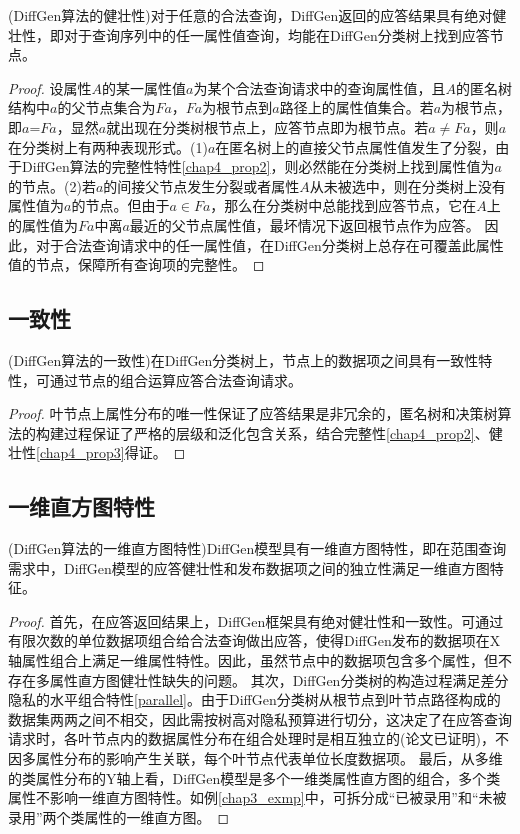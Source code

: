 \begin{prop}
	(DiffGen算法的健壮性)对于任意的合法查询，DiffGen返回的应答结果具有绝对健壮性，即对于查询序列中的任一属性值查询，均能在DiffGen分类树上找到应答节点。
\end{prop}
\begin{proof}
	设属性$A$的某一属性值$a$为某个合法查询请求中的查询属性值，且$A$的匿名树结构中$a$的父节点集合为$Fa$，$Fa$为根节点到$a$路径上的属性值集合。若$a$为根节点，即$a$=$Fa$，显然$a$就出现在分类树根节点上，应答节点即为根节点。若$a$$\neq$$Fa$，则$a$在分类树上有两种表现形式。(1)$a$在匿名树上的直接父节点属性值发生了分裂，由于DiffGen算法的完整性特性\ref{chap4_prop2}，则必然能在分类树上找到属性值为$a$的节点。(2)若$a$的间接父节点发生分裂或者属性$A$从未被选中，则在分类树上没有属性值为$a$的节点。但由于$a$$\in$$Fa$，那么在分类树中总能找到应答节点，它在$A$上的属性值为$Fa$中离$a$最近的父节点属性值，最坏情况下返回根节点作为应答。
	因此，对于合法查询请求中的任一属性值，在DiffGen分类树上总存在可覆盖此属性值的节点，保障所有查询项的完整性。
\end{proof}

\subsection{一致性}

\begin{prop}

	(DiffGen算法的一致性)在DiffGen分类树上，节点上的数据项之间具有一致性特性，可通过节点的组合运算应答合法查询请求。
\end{prop}
\begin{proof}
	叶节点上属性分布的唯一性保证了应答结果是非冗余的，匿名树和决策树算法的构建过程保证了严格的层级和泛化包含关系，结合完整性\ref{chap4_prop2}、健壮性\ref{chap4_prop3}得证。
\end{proof}

\subsection{一维直方图特性}

\begin{prop}
	(DiffGen算法的一维直方图特性)DiffGen模型具有一维直方图特性，即在范围查询需求中，DiffGen模型的应答健壮性和发布数据项之间的独立性满足一维直方图特征。
\end{prop}
\begin{proof}
	首先，在应答返回结果上，DiffGen框架具有绝对健壮性和一致性。可通过有限次数的单位数据项组合给合法查询做出应答，使得DiffGen发布的数据项在X轴属性组合上满足一维属性特性。因此，虽然节点中的数据项包含多个属性，但不存在多属性直方图健壮性缺失的问题。%
	其次，DiffGen分类树的构造过程满足差分隐私的水平组合特性\ref{parallel}。由于DiffGen分类树从根节点到叶节点路径构成的数据集两两之间不相交，因此需按树高对隐私预算进行切分，这决定了在应答查询请求时，各叶节点内的数据属性分布在组合处理时是相互独立的(论文\parencite{DiffGen}已证明)，不因多属性分布的影响产生关联，每个叶节点代表单位长度数据项。
	最后，从多维的类属性分布的Y轴上看，DiffGen模型是多个一维类属性直方图的组合，多个类属性不影响一维直方图特性。如例\ref{chap3_exmp}中，可拆分成“已被录用”和“未被录用”两个类属性的一维直方图。
\end{proof}

